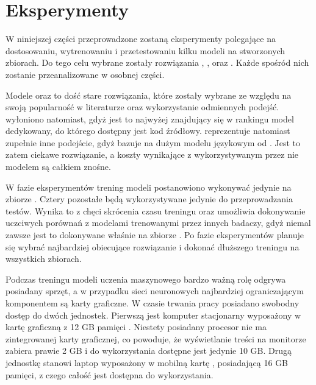 \chapter{Eksperymenty}

W niniejszej części przeprowadzone zostaną eksperymenty polegające na dostosowaniu, wytrenowaniu i przetestowaniu kilku modeli na stworzonych zbiorach. Do tego celu wybrane zostały rozwiązania , ,  oraz . Każde spośród nich zostanie przeanalizowane w osobnej części. 

Modele  oraz  to dość stare rozwiązania, które zostały wybrane ze względu na swoją popularność w literaturze oraz wykorzystanie odmiennych podejść.  wyłoniono natomiast, gdyż jest to najwyżej znajdujący się w rankingu  model dedykowany, do którego dostępny jest kod źródłowy.  reprezentuje natomiast zupełnie inne podejście, gdyż bazuje na dużym modelu językowym od . Jest to zatem ciekawe rozwiązanie, a koszty wynikające z wykorzystywanym przez nie modelem  są całkiem znośne.

W fazie eksperymentów trening modeli postanowiono wykonywać jedynie na zbiorze . Cztery pozostałe będą wykorzystywane jedynie do przeprowadzania testów. Wynika to z chęci skrócenia czasu treningu oraz umożliwia dokonywanie uczciwych porównań z modelami trenowanymi przez innych badaczy, gdyż niemal zawsze jest to dokonywane właśnie na zbiorze . Po fazie eksperymentów planuje się wybrać najbardziej obiecujące rozwiązanie i dokonać dłuższego treningu na wszystkich zbiorach.

Podczas treningu modeli uczenia maszynowego bardzo ważną rolę odgrywa posiadany sprzęt, a w przypadku sieci neuronowych najbardziej ograniczającym komponentem są karty graficzne. W czasie trwania pracy posiadano swobodny dostęp do dwóch jednostek. Pierwszą jest komputer stacjonarny wyposażony w kartę graficzną  z 12 GB pamięci . Niestety posiadany procesor nie ma zintegrowanej karty graficznej, co powoduje, że wyświetlanie treści na monitorze zabiera prawie 2 GB i do wykorzystania dostępne jest jedynie 10 GB. Drugą jednostkę stanowi laptop  wyposażony w mobilną kartę , posiadającą 16 GB pamięci, z czego całość jest dostępna do wykorzystania.










